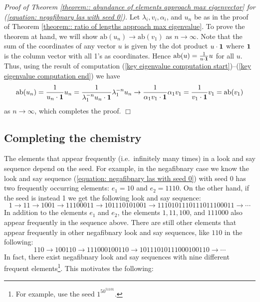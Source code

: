 \documentclass[reqno]{amsart}
\theoremstyle{definition}
\newcommand{\ab}{\text{ab}}
\begin{document}
\bigskip

\noindent\emph{Proof of Theorem \ref{theorem:: abundance of elements approach max eigenvector} for (\ref{equation: negafibnary las with seed 0}).} Let $\lambda_i, v_i, \alpha_i$, and $u_n$ be as in the proof of Theorem \ref{theorem:: ratio of lengths approach max eigenvalue}. To prove the theorem at hand, we will show $\ab(u_n)\to\ab(v_1)$ as $n\to\infty$. Note that the sum of the coordinates of any vector $u$ is given by the dot product $u\cdot{\bf 1}$ where ${\bf 1}$ is the column vector with all 1's as coordinates. Hence $\ab(u)=\frac{1}{u\cdot{\bf 1}}u$ for all $u$. Thus, using the result of computation (\ref{key eigenvalue computation start})--(\ref{key eigenvalue computation end}) we have 
\begin{equation*}
\ab(u_n)=\frac{1}{u_n\cdot{\bf 1}}u_n=\frac{1}{\lambda_1^{-n}u_n\cdot{\bf 1}}\lambda_1^{-n}u_n\to\frac{1}{\alpha_1 v_1\cdot{\bf 1}}\alpha_1 v_1=\frac{1}{v_1\cdot{\bf 1}} v_1=\ab(v_1)
\end{equation*}
as $n\to\infty$, which completes the proof. \hfill$\Box$


\subsection{Completing the chemistry} 
The elements that appear frequently (i.e.~infinitely many times) in a look and say sequence depend on the seed. For example, in the negafibnary case we know the look and say sequence (\ref{equation: negafibnary las with seed 0}) with seed 0 has two frequently occurring elements: $e_1=10$ and $e_2=1110$. On the other hand, if the seed is instead 1 we get the following look and say sequence:
\begin{equation*}\label{negafibnary las with seed 1}
1 \to 11 \to 1001 \to 11100011 \to 101110101001 \to 1110101110111011100011 \to \cdots
\end{equation*}
In addition to the elements $e_1$ and $e_2$, the elements $1, 11, 100$, and $111000$ also appear frequently in the sequence above. There are still other elements that appear frequently in other negafibnary look and say sequences, like $110$ in the following:
\begin{equation}\label{negafibnary las with seed 110}
110 \to 100110 \to 111000100110 \to 10111010111000100110 \to\cdots
\end{equation}
In fact, there exist negafibnary look and say sequences with nine different frequent elements\footnote{For example, use the seed $1^50^51101$.}. This motivates the following:
\end{document}
